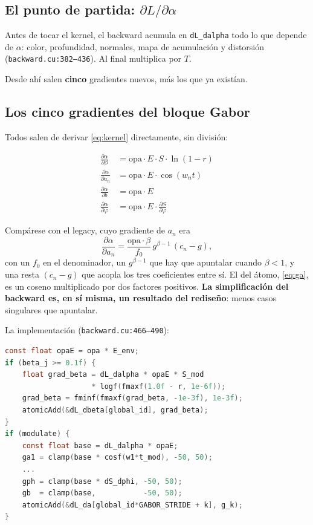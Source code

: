 \documentclass[12pt]{extarticle}
\newcommand{\code}[1]{\texttt{#1}}
\begin{document}
\subsection{El punto de partida: $\partial L/\partial\alpha$}

Antes de tocar el kernel, el backward acumula en \code{dL\_dalpha} todo lo que
depende de $\alpha$: color, profundidad, normales, mapa de acumulación y
distorsión (\code{backward.cu:382--436}). Al final multiplica por $T$.

Desde ahí salen \textbf{cinco} gradientes nuevos, más los que ya existían.

\subsection{Los cinco gradientes del bloque Gabor}

Todos salen de derivar \eqref{eq:kernel} directamente, sin división:

\begin{align}
\frac{\partial\alpha}{\partial\beta}   &= \text{opa}\cdot E\cdot S\cdot\ln(1-r) \label{eq:gbeta}\\
\frac{\partial\alpha}{\partial a_n}    &= \text{opa}\cdot E\cdot\cos(w_n t) \label{eq:ga}\\
\frac{\partial\alpha}{\partial b}      &= \text{opa}\cdot E \label{eq:gb}\\
\frac{\partial\alpha}{\partial \varphi}&= \text{opa}\cdot E\cdot\frac{\partial S}{\partial\varphi} \label{eq:gphi}
\end{align}

Compárese con el legacy, cuyo gradiente de $a_n$ era
\[
\frac{\partial\alpha}{\partial a_n}
=\frac{\text{opa}\cdot\beta}{f_0}\,g^{\beta-1}\,(c_n-g),
\]
con un $f_0$ en el denominador, un $g^{\beta-1}$ que hay que apuntalar cuando
$\beta<1$, y una resta $(c_n-g)$ que acopla los tres coeficientes entre sí.
El del átomo, \eqref{eq:ga}, es un coseno multiplicado por dos factores
positivos. \textbf{La simplificación del backward es, en sí misma, un
resultado del rediseño}: menos casos singulares que apuntalar.

La implementación (\code{backward.cu:466--490}):

\begin{lstlisting}[language=C]
const float opaE = opa * E_env;
if (beta_j >= 0.1f) {
    float grad_beta = dL_dalpha * opaE * S_mod
                    * logf(fmaxf(1.0f - r, 1e-6f));
    grad_beta = fminf(fmaxf(grad_beta, -1e-3f), 1e-3f);
    atomicAdd(&dL_dbeta[global_id], grad_beta);
}
if (modulate) {
    const float base = dL_dalpha * opaE;
    ga1 = clamp(base * cosf(w1*t_mod), -50, 50);
    ...
    gph = clamp(base * dS_dphi, -50, 50);
    gb  = clamp(base,           -50, 50);
    atomicAdd(&dL_da[global_id*GABOR_STRIDE + k], g_k);
}
\end{lstlisting}
\end{document}
